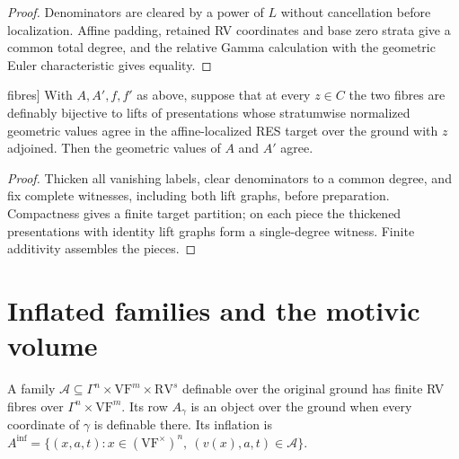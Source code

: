 \begin{proof}
Denominators are cleared by a power of $L$ without cancellation before localization. Affine padding, retained RV coordinates and base zero strata give a common total degree, and the relative Gamma calculation with the geometric Euler characteristic gives equality.
\end{proof}

\begin{theorem}[Geometric Fubini with RV[*] fibres]
\label{weak-geometric}
\leanok
{}
With $A,A',f,f'$ as above, suppose that at every $z\in C$ the two fibres are definably bijective to lifts of presentations whose stratumwise normalized geometric values agree in the affine-localized RES target over the ground with $z$ adjoined. Then the geometric values of $A$ and $A'$ agree.
\end{theorem}

\begin{proof}
Thicken all vanishing labels, clear denominators to a common degree, and fix complete witnesses, including both lift graphs, before preparation. Compactness gives a finite target partition; on each piece the thickened presentations with identity lift graphs form a single-degree witness. Finite additivity assembles the pieces.
\end{proof}

\section{Inflated families and the motivic volume}

\begin{definition}
\label{gamma-family}
\leanok
{}
A family $\mathcal A\subseteq\Gamma^n\times\mathrm{VF}^m\times\mathrm{RV}^s$ definable over the original ground has finite RV fibres over $\Gamma^n\times\mathrm{VF}^m$. Its row $A_\gamma$ is an object over the ground when every coordinate of $\gamma$ is definable there. Its inflation is $A^{\mathrm{inf}}=\{(x,a,t):x\in(\mathrm{VF}^\times)^n,\ (v(x),a,t)\in\mathcal A\}$.
\end{definition}

